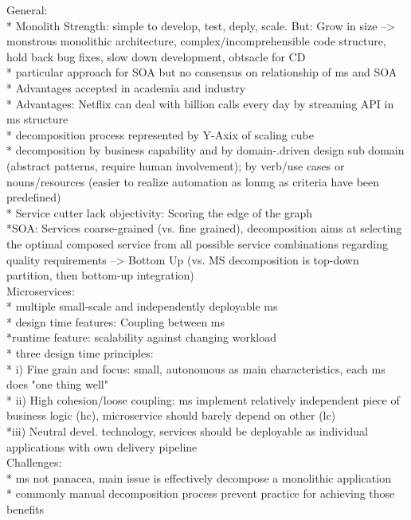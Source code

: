 General: \\
* Monolith Strength: simple to develop, test, deply, scale. But: Grow in size --> monstrous monolithic architecture, complex/incomprehensible code structure, hold back bug fixes, slow down development, obtsacle for CD\\
* particular approach for SOA but no consensus on relationship of ms and SOA \\
* Advantages  accepted in academia and industry\\
* Advantages: Netflix can deal with billion calls every day by streaming API in ms structure\\
* decomposition process represented by Y-Axix of scaling cube\\
* decomposition by business capability and by domain-.driven design sub domain (abstract patterns, require human involvement); by verb/use cases or nouns/resources (easier to realize automation as lonmg as criteria have been predefined)\\
* Service cutter lack objectivity: Scoring the edge of the graph\\
*SOA: Services coarse-grained (vs. fine grained), decomposition aims at selecting the optimal composed service from all possible service combinations regarding quality requirements --> Bottom Up (vs. MS decomposition is top-down partition, then bottom-up integration)\\

Microservices: \\
* multiple small-scale and independently deployable ms\\
* design time features: Coupling between ms \\
*runtime feature: scalability against changing workload\\
* three design time principles:\\
* i) Fine grain and focus: small, autonomous as main characteristics, each ms does "one thing well"\\
* ii) High cohesion/loose coupling: ms implement relatively independent piece of business logic (hc), microservice should barely depend on other (lc) \\
*iii) Neutral devel. technology, services should be deployable as individual applications with own delivery pipeline \\


Challenges:\\
* ms not panacea, main issue is effectively decompose a monolithic application \\
* commonly manual decomposition process prevent practice for achieving those benefits \\



